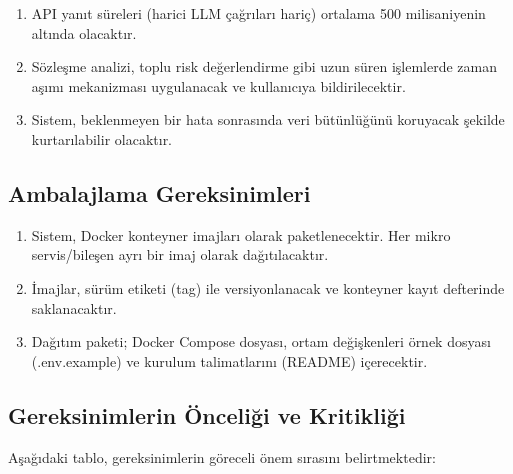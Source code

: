 \documentclass[12pt, a4paper]{article}
\begin{document}
\begin{enumerate}[leftmargin=2cm]
    \item API yanıt süreleri (harici LLM çağrıları hariç) ortalama 500 milisaniyenin altında olacaktır.
    \item Sözleşme analizi, toplu risk değerlendirme gibi uzun süren işlemlerde zaman aşımı mekanizması uygulanacak ve kullanıcıya bildirilecektir.
    \item Sistem, beklenmeyen bir hata sonrasında veri bütünlüğünü koruyacak şekilde kurtarılabilir olacaktır.
\end{enumerate}

\subsection{Ambalajlama Gereksinimleri}

\begin{enumerate}[leftmargin=2cm]
    \item Sistem, Docker konteyner imajları olarak paketlenecektir. Her mikro servis/bileşen ayrı bir imaj olarak dağıtılacaktır.
    \item İmajlar, sürüm etiketi (tag) ile versiyonlanacak ve konteyner kayıt defterinde saklanacaktır.
    \item Dağıtım paketi; Docker Compose dosyası, ortam değişkenleri örnek dosyası (.env.example) ve kurulum talimatlarını (README) içerecektir.
\end{enumerate}

\subsection{Gereksinimlerin Önceliği ve Kritikliği}

Aşağıdaki tablo, gereksinimlerin göreceli önem sırasını belirtmektedir:
\end{document}

